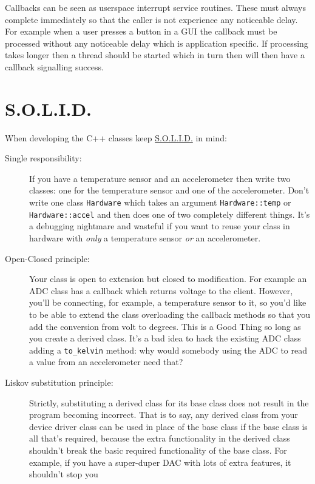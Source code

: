 \documentclass[12pt]{report}
\begin{document}
Callbacks can be seen as userspace interrupt service routines.
These must always complete immediately so that the caller is
not experience any noticeable delay. For example when a user
presses a button in a GUI the callback must be
processed without any noticeable delay which is application specific.
If processing takes
longer then a thread should be started which in turn then will
then have a callback signalling success.


\section{S.O.L.I.D.}
When developing the C++ classes keep 
\href{https://www.digitalocean.com/community/conceptual_articles/s-o-l-i-d-the-first-five-principles-of-object-oriented-design}{S.O.L.I.D.}
in mind:
\begin{description}
\item[Single responsibility:] If you have a temperature
sensor and an accelerometer then write two classes: one for the
temperature sensor and one of the accelerometer. Don't write one
class \texttt{Hardware} which takes an argument \texttt{Hardware::temp}
or \texttt{Hardware::accel} and then does one of two completely different
things. It's a debugging nightmare and wasteful if you want to reuse
your class in hardware with \emph{only} a temperature sensor \emph{or}
an accelerometer.
\item[Open-Closed principle:] Your class is open to extension but
  closed to modification. For example an ADC class
  has a callback which returns voltage to the client. However,
  you'll be connecting, for example, a temperature sensor to
  it, so you'd like to be able to extend the class
  overloading the callback methods so that you add the conversion
  from volt to degrees. This is a Good Thing\texttrademark{} so long as
  you create a derived class. It's a bad idea to hack the existing
  ADC class adding a \texttt{to\_kelvin} method: why would somebody
  using the ADC to read a value from an accelerometer need that?
\item[Liskov substitution principle:] Strictly, substituting
  a derived class for its base class does not result in the program
  becoming incorrect. That is to say, any derived class from
  your device driver class can be used in place of the base class if
  the base class is all that's required, because the extra
  functionality in the derived class shouldn't break the basic
  required functionality of the base class. For example, if you have a
  super-duper DAC with lots of extra features, it shouldn't stop you

\end{description}
\end{document}

